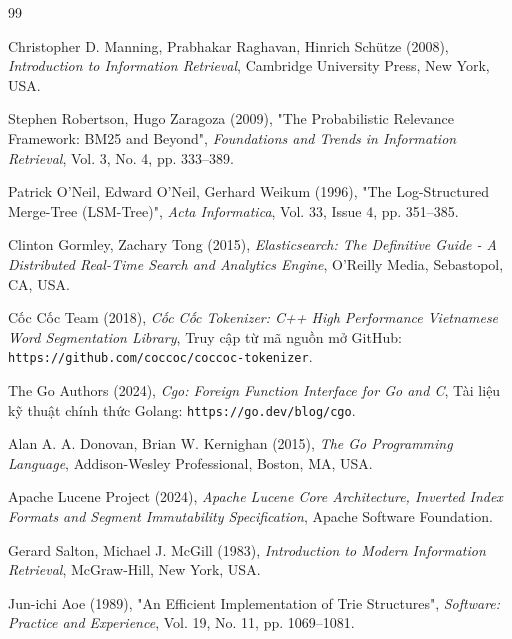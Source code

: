 \documentclass[12pt,a4paper,oneside]{report}
\begin{document}
\begin{thebibliography}{99}

Christopher D. Manning, Prabhakar Raghavan, Hinrich Sch\"{u}tze (2008),
\textit{Introduction to Information Retrieval},
Cambridge University Press, New York, USA.

Stephen Robertson, Hugo Zaragoza (2009),
"The Probabilistic Relevance Framework: BM25 and Beyond",
\textit{Foundations and Trends in Information Retrieval},
Vol. 3, No. 4, pp. 333--389.

Patrick O'Neil, Edward O'Neil, Gerhard Weikum (1996),
"The Log-Structured Merge-Tree (LSM-Tree)",
\textit{Acta Informatica},
Vol. 33, Issue 4, pp. 351--385.

Clinton Gormley, Zachary Tong (2015),
\textit{Elasticsearch: The Definitive Guide - A Distributed Real-Time Search and Analytics Engine},
O'Reilly Media, Sebastopol, CA, USA.

Cốc Cốc Team (2018),
\textit{Cốc Cốc Tokenizer: C++ High Performance Vietnamese Word Segmentation Library},
Truy cập từ mã nguồn mở GitHub: \texttt{https://github.com/coccoc/coccoc-tokenizer}.

The Go Authors (2024),
\textit{Cgo: Foreign Function Interface for Go and C},
Tài liệu kỹ thuật chính thức Golang: \texttt{https://go.dev/blog/cgo}.

Alan A. A. Donovan, Brian W. Kernighan (2015),
\textit{The Go Programming Language},
Addison-Wesley Professional, Boston, MA, USA.

Apache Lucene Project (2024),
\textit{Apache Lucene Core Architecture, Inverted Index Formats and Segment Immutability Specification},
Apache Software Foundation.

Gerard Salton, Michael J. McGill (1983),
\textit{Introduction to Modern Information Retrieval},
McGraw-Hill, New York, USA.

Jun-ichi Aoe (1989),
"An Efficient Implementation of Trie Structures",
\textit{Software: Practice and Experience},
Vol. 19, No. 11, pp. 1069--1081.

\end{thebibliography}
\end{document}

